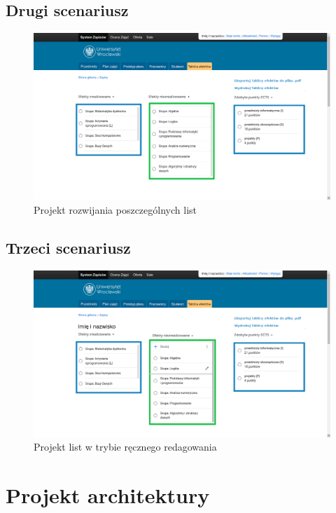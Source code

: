 \documentclass{article}
\begin{document}
\subsection{Drugi scenariusz}
\begin{figure}[H]
	\begin{center}
		\includegraphics[scale=0.23]{rozwin.png}
		\caption{Projekt rozwijania poszczególnych list}
	\end{center}
\end{figure}

\subsection{Trzeci scenariusz}
\begin{figure}[H]
	\begin{center}
		\includegraphics[scale=0.23]{edycja.png}
		\caption{Projekt list w trybie ręcznego redagowania}
	\end{center}
\end{figure}


\section{Projekt architektury}
\end{document}
